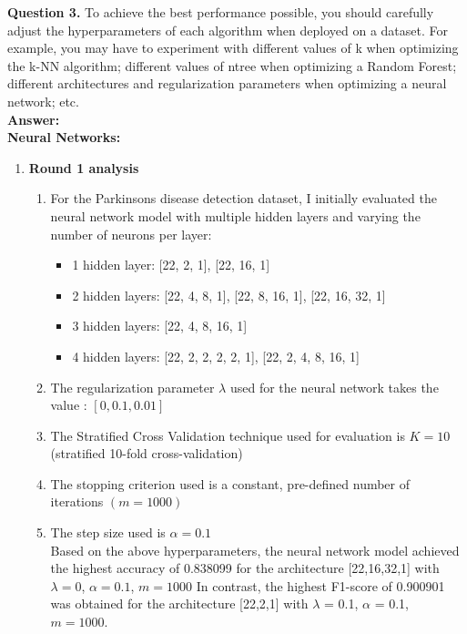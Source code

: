 \documentclass{article}
\begin{document}
\vspace{0.3cm}

\noindent \textbf{Question 3.} To achieve the best performance possible, you should carefully adjust the hyperparameters of each algorithm when deployed on a dataset. For example, you may have to experiment with different values of k when optimizing the k-NN algorithm; different values of ntree when optimizing a Random Forest; different architectures and regularization parameters when optimizing a neural network; etc.\\

\noindent \textbf{Answer:}\\

\textbf{Neural Networks:}

\begin{enumerate}

\item \textbf{Round 1 analysis}

\begin{enumerate}

\item For the Parkinsons disease detection dataset, I initially evaluated the neural network model with multiple hidden layers and varying the number of neurons per layer:

\begin{itemize}
    \item 1 hidden layer: [22, 2, 1], [22, 16, 1]
    \item 2 hidden layers: [22, 4, 8, 1], [22, 8, 16, 1], [22, 16, 32, 1]
    \item 3 hidden layers: [22, 4, 8, 16, 1]
    \item 4 hidden layers: [22, 2, 2, 2, 2, 1], [22, 2, 4, 8, 16, 1]
\end{itemize}

\item The regularization parameter $\lambda$ used for the neural network takes the value : $[0, 0.1, 0.01]$
\item The Stratified Cross Validation technique used for evaluation is $K = 10$ (stratified 10-fold cross-validation)
\item The stopping criterion used is a constant, pre-defined number of iterations $(m = 1000)$
\item The step size used is $\alpha = 0.1$ \\

Based on the above hyperparameters, the neural network model achieved the highest accuracy of 0.838099 for the architecture [22,16,32,1] with $\lambda = 0$, $\alpha = 0.1$, $m = 1000$
In contrast, the highest F1-score of 0.900901 was obtained for the architecture [22,2,1] with $\lambda$ = 0.1, $\alpha$ = 0.1, $m = 1000$.\\


\end{enumerate}
\end{enumerate}
\end{document}

